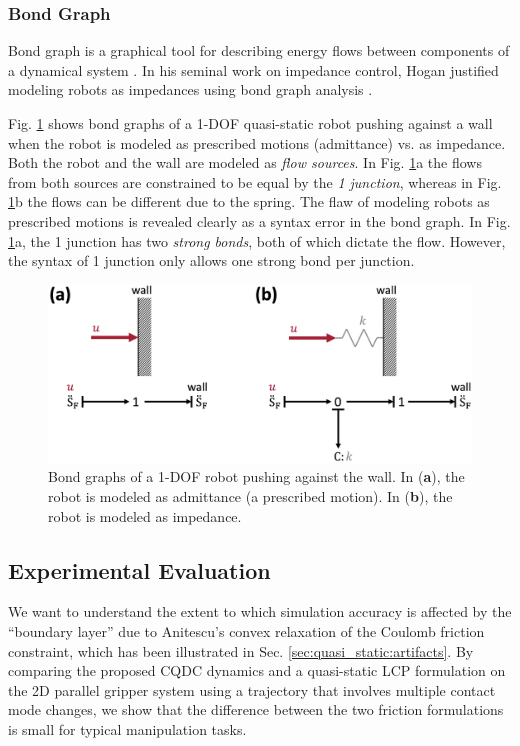\subsubsection{Bond Graph}
Bond graph is a graphical tool for describing energy flows between components of a dynamical system \cite{bondgraph}. In his seminal work on impedance control, Hogan justified modeling robots as impedances using bond graph analysis \cite{hogan1984impedance}. 

Fig. \ref{fig:bond_graph} shows bond graphs of a 1-DOF quasi-static robot pushing against a wall when the robot is modeled as prescribed motions (admittance) vs. as impedance. Both the robot and the wall are modeled as \emph{flow sources}. In Fig. \ref{fig:bond_graph}a the flows from both sources are constrained to be equal by the \emph{1 junction}, whereas in Fig. \ref{fig:bond_graph}b the flows can be different due to the spring. The flaw of modeling robots as prescribed motions is revealed clearly as a syntax error in the bond graph. In Fig. \ref{fig:bond_graph}a, the 1 junction has two \emph{strong bonds}, both of which dictate the flow. However, the syntax of 1 junction only allows one strong bond per junction.
\begin{figure}
\centering
\includegraphics[width=1.0\linewidth]{figures/02_quasi_static_dynamics/bond_graph.png}
\caption{Bond graphs of a 1-DOF robot pushing against the wall. In (\textbf{a}), the robot is modeled as admittance (a prescribed motion). In (\textbf{b}), the robot is modeled as impedance. }
\label{fig:bond_graph}
\end{figure}

\subsection{Experimental Evaluation} \label{sec:quasi_static:experiments}
We want to understand the extent to which simulation accuracy is affected by the ``boundary layer'' due to Anitescu's convex relaxation of the Coulomb friction constraint, which has been illustrated in Sec. \ref{sec:quasi_static:artifacts}. By comparing the proposed CQDC dynamics and a quasi-static LCP formulation on the 2D parallel gripper system using a trajectory that involves multiple contact mode changes, we show that the difference between the two friction formulations is small for typical manipulation tasks.


